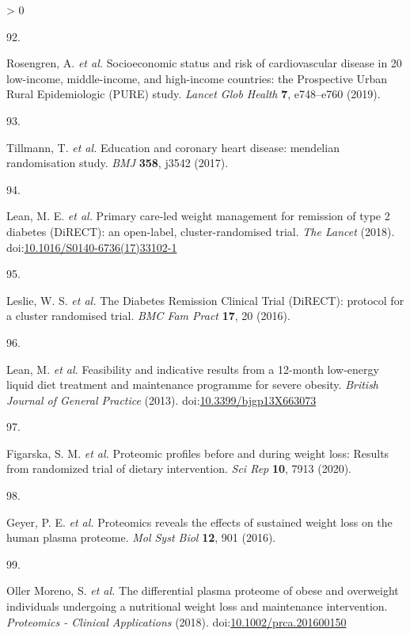 \documentclass[11pt,twoside]{bristolthesis}
\newlength{\cslhangindent}
\newlength{\csllabelwidth}
\newenvironment{CSLReferences}[2] %
 {%
  \setlength{\parindent}{0pt}
  \ifodd #1 \everypar{\setlength{\hangindent}{\cslhangindent}}\ignorespaces\fi
  \ifnum #2 > 0
  \setlength{\parskip}{#2\baselineskip}
  \fi
 }%
 {}
\newcommand{\CSLLeftMargin}[1]{\parbox[t]{\csllabelwidth}{#1}}
\newcommand{\CSLRightInline}[1]{\parbox[t]{\linewidth - \csllabelwidth}{#1}\break}
\begin{document}
\begin{CSLReferences}{0}{0}
\leavevmode\hypertarget{ref-Rosengren2019}{}%
\CSLLeftMargin{92. }
\CSLRightInline{Rosengren, A. \emph{et al.} {Socioeconomic status and risk of cardiovascular disease in 20 low-income, middle-income, and high-income countries: the Prospective Urban Rural Epidemiologic (PURE) study}. \emph{Lancet Glob Health} \textbf{7}, e748--e760 (2019).}

\leavevmode\hypertarget{ref-Tillmann2017}{}%
\CSLLeftMargin{93. }
\CSLRightInline{Tillmann, T. \emph{et al.} {Education and coronary heart disease: mendelian randomisation study}. \emph{BMJ} \textbf{358}, j3542 (2017).}

\leavevmode\hypertarget{ref-Lean2018}{}%
\CSLLeftMargin{94. }
\CSLRightInline{Lean, M. E. \emph{et al.} {Primary care-led weight management for remission of type 2 diabetes (DiRECT): an open-label, cluster-randomised trial}. \emph{The Lancet} (2018). doi:\href{https://doi.org/10.1016/S0140-6736(17)33102-1}{10.1016/S0140-6736(17)33102-1}}

\leavevmode\hypertarget{ref-Leslie2016}{}%
\CSLLeftMargin{95. }
\CSLRightInline{Leslie, W. S. \emph{et al.} {The Diabetes Remission Clinical Trial (DiRECT): protocol for a cluster randomised trial}. \emph{BMC Fam Pract} \textbf{17}, 20 (2016).}

\leavevmode\hypertarget{ref-Lean2013}{}%
\CSLLeftMargin{96. }
\CSLRightInline{Lean, M. \emph{et al.} {Feasibility and indicative results from a 12-month low-energy liquid diet treatment and maintenance programme for severe obesity}. \emph{British Journal of General Practice} (2013). doi:\href{https://doi.org/10.3399/bjgp13X663073}{10.3399/bjgp13X663073}}

\leavevmode\hypertarget{ref-Figarska2020}{}%
\CSLLeftMargin{97. }
\CSLRightInline{Figarska, S. M. \emph{et al.} {Proteomic profiles before and during weight loss: Results from randomized trial of dietary intervention}. \emph{Sci Rep} \textbf{10}, 7913 (2020).}

\leavevmode\hypertarget{ref-Geyer2016}{}%
\CSLLeftMargin{98. }
\CSLRightInline{Geyer, P. E. \emph{et al.} {Proteomics reveals the effects of sustained weight loss on the human plasma proteome}. \emph{Mol Syst Biol} \textbf{12}, 901 (2016).}

\leavevmode\hypertarget{ref-OllerMoreno2018}{}%
\CSLLeftMargin{99. }
\CSLRightInline{Oller Moreno, S. \emph{et al.} {The differential plasma proteome of obese and overweight individuals undergoing a nutritional weight loss and maintenance intervention}. \emph{Proteomics - Clinical Applications} (2018). doi:\href{https://doi.org/10.1002/prca.201600150}{10.1002/prca.201600150}}


\end{CSLReferences}
\end{document}
